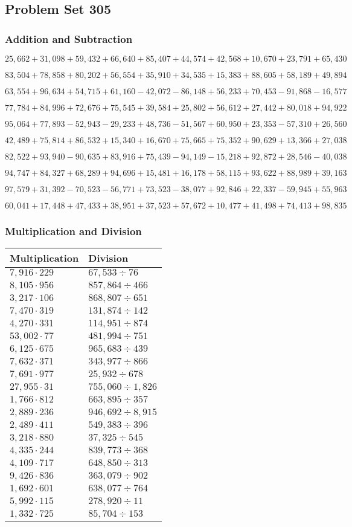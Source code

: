 \hypertarget{problem-set-305}{%
\subsection{Problem Set 305}\label{problem-set-305}}

\hypertarget{addition-and-subtraction}{%
\subsubsection{Addition and
Subtraction}\label{addition-and-subtraction}}

\(25,662+31,098+59,432+66,640+85,407+44,574+42,568+10,670+23,791+65,430\)

\(83,504+78,858+80,202+56,554+35,910+34,535+15,383+88,605+58,189+49,894\)

\(63,554+96,634+54,715+61,160-42,072-86,148+56,233+70,453-91,868-16,577\)

\(77,784+84,996+72,676+75,545+39,584+25,802+56,612+27,442+80,018+94,922\)

\(95,064+77,893-52,943-29,233+48,736-51,567+60,950+23,353-57,310+26,560\)

\(42,489+75,814+86,532+15,340+16,670+75,665+75,352+90,629+13,366+27,038\)

\(82,522+93,940-90,635+83,916+75,439-94,149-15,218+92,872+28,546-40,038\)

\(94,747+84,327+68,289+94,696+15,481+16,178+58,115+93,622+88,989+39,163\)

\(97,579+31,392-70,523-56,771+73,523-38,077+92,846+22,337-59,945+55,963\)

\(60,041+17,448+47,433+38,951+37,523+57,672+10,477+41,498+74,413+98,835\)

\hypertarget{multiplication-and-division}{%
\subsubsection{Multiplication and
Division}\label{multiplication-and-division}}

\begin{longtable}[]{@{}ll@{}}
\toprule
Multiplication & Division\tabularnewline
\midrule
\endhead
\(7,916\cdot229\) & \(67,533÷76\)\tabularnewline
\(8,105\cdot956\) & \(857,864÷466\)\tabularnewline
\(3,217\cdot106\) & \(868,807÷651\)\tabularnewline
\(7,470\cdot319\) & \(131,874÷142\)\tabularnewline
\(4,270\cdot331\) & \(114,951÷874\)\tabularnewline
\(53,002\cdot77\) & \(481,994÷751\)\tabularnewline
\(6,125\cdot675\) & \(965,683÷439\)\tabularnewline
\(7,632\cdot371\) & \(343,977÷866\)\tabularnewline
\(7,691\cdot977\) & \(25,932÷678\)\tabularnewline
\(27,955\cdot31\) & \(755,060÷1,826\)\tabularnewline
\(1,766\cdot812\) & \(663,895÷357\)\tabularnewline
\(2,889\cdot236\) & \(946,692÷8,915\)\tabularnewline
\(2,489\cdot411\) & \(549,383÷396\)\tabularnewline
\(3,218\cdot880\) & \(37,325÷545\)\tabularnewline
\(4,335\cdot244\) & \(839,773÷368\)\tabularnewline
\(4,109\cdot717\) & \(648,850÷313\)\tabularnewline
\(9,426\cdot836\) & \(363,079÷902\)\tabularnewline
\(1,692\cdot601\) & \(638,077÷764\)\tabularnewline
\(5,992\cdot115\) & \(278,920÷11\)\tabularnewline
\(1,332\cdot725\) & \(85,704÷153\)\tabularnewline
\bottomrule
\end{longtable}
